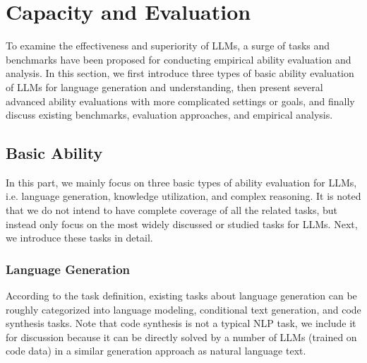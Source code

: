 {{{{{\section{Capacity and Evaluation}
\label{sec-evaluation}
To examine the effectiveness and superiority of LLMs, a surge of tasks and benchmarks have been proposed for conducting empirical ability evaluation and analysis. In this section, we first introduce three types of basic ability evaluation of LLMs for language generation and understanding, then present several advanced ability evaluations with more complicated settings or goals, and finally discuss existing benchmarks, evaluation approaches, and empirical analysis.

\subsection{Basic Ability}\label{sec:basicability}
In this part, we mainly focus on three basic types of ability evaluation for LLMs, i.e. language generation, knowledge utilization, and complex reasoning. It is noted that we do not intend to have complete coverage of all the related tasks, but instead only focus on the most widely discussed or studied tasks for LLMs.  Next, we introduce these tasks in detail.  

\subsubsection{Language Generation}
\label{sec-langauge-generation}
According to the task definition, existing tasks about language generation can be roughly categorized into language modeling, conditional text generation, and code synthesis tasks. Note that code synthesis is not a typical NLP task, we include it for discussion because it can be directly solved by a number of LLMs (trained on code data) in a similar generation approach as natural language text.   

}}}}}
